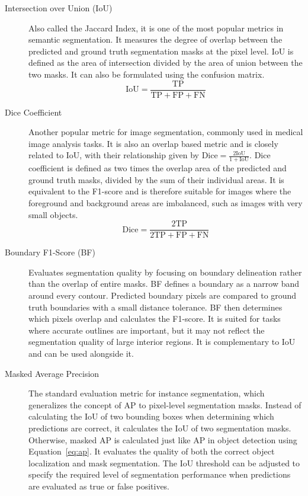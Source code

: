 \begin{description}
    \item[Intersection over Union (IoU)] Also called the Jaccard Index, it is one of the most popular metrics in semantic segmentation. It measures the degree of overlap between the predicted and ground truth segmentation masks at the pixel level. IoU is defined as the area of intersection divided by the area of union between the two masks. It can also be formulated using the confusion matrix.~\cite{Terven2025, Minaee2022}
    \begin{equation}
        \text{IoU} = \frac{\mathrm{TP}}{\mathrm{TP} + \mathrm{FP} + \mathrm{FN}}
    \end{equation}
    
    \item[Dice Coefficient] Another popular metric for image segmentation, commonly used in medical image analysis tasks. It is also an overlap based metric and is closely related to IoU, with their relationship given by $\text{Dice} = \frac{2\text{IoU}}{1 + \text{IoU}}$. Dice coefficient is defined as two times the overlap area of the predicted and ground truth masks, divided by the sum of their individual areas. It is equivalent to the F1-score and is therefore suitable for images where the foreground and background areas are imbalanced, such as images with very small objects.~\cite{Terven2025, Minaee2022}
    \begin{equation}
        \text{Dice} = \frac{2\mathrm{TP}}{2\mathrm{TP} + \mathrm{FP} + \mathrm{FN}}
    \end{equation}
    
    \item[Boundary F1-Score (BF)] Evaluates segmentation quality by focusing on boundary delineation rather than the overlap of entire masks. BF defines a boundary as a narrow band around every contour. Predicted boundary pixels are compared to ground truth boundaries with a small distance tolerance. BF then determines which pixels overlap and calculates the F1-score. It is suited for tasks where accurate outlines are important, but it may not reflect the segmentation quality of large interior regions. It is complementary to IoU and can be used alongside it.~\cite{Terven2025, Csurka2013}
    
    \item[Masked Average Precision] The standard evaluation metric for instance segmentation, which generalizes the concept of AP to pixel-level segmentation masks. Instead of calculating the IoU of two bounding boxes when determining which predictions are correct, it calculates the IoU of two segmentation masks. Otherwise, masked AP is calculated just like AP in object detection using Equation~\ref{eq:ap}. It evaluates the quality of both the correct object localization and mask segmentation. The IoU threshold can be adjusted to specify the required level of segmentation performance when predictions are evaluated as true or false positives.~\cite{Terven2025}
\end{description}



